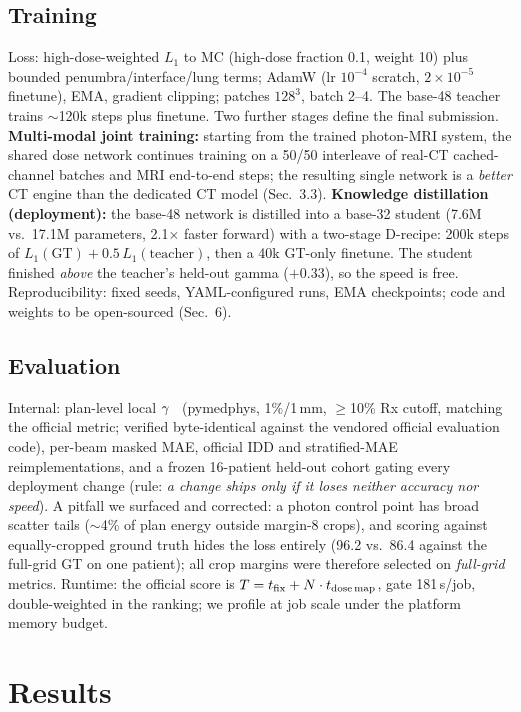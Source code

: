 \documentclass{llncs}
\begin{document}
\subsection{Training}
Loss: high-dose-weighted $L_1$ to MC (high-dose fraction 0.1, weight 10) plus bounded
penumbra/interface/lung terms; AdamW (lr $10^{-4}$ scratch, $2\times10^{-5}$ finetune), EMA,
gradient clipping; patches $128^3$, batch 2--4. The base-48 teacher trains $\sim$120k steps plus
finetune. Two further stages define the final submission. \textbf{Multi-modal joint training:}
starting from the trained photon-MRI system, the shared dose network continues training on a
50/50 interleave of real-CT cached-channel batches and MRI end-to-end steps; the resulting
single network is a \emph{better} CT engine than the dedicated CT model (Sec.~3.3).
\textbf{Knowledge distillation (deployment):} the base-48 network is distilled into a base-32
student (7.6M vs.\ 17.1M parameters, 2.1$\times$ faster forward) with a two-stage D-recipe:
200k steps of $L_1(\mathrm{GT})+0.5\,L_1(\mathrm{teacher})$, then a 40k GT-only finetune. The
student finished \emph{above} the teacher's held-out gamma ($+0.33$), so the speed is free.
Reproducibility: fixed seeds, YAML-configured runs, EMA checkpoints; code and weights to be
open-sourced (Sec.~6).

\subsection{Evaluation}
Internal: plan-level local $\gamma$~\cite{gamma} (pymedphys, 1\%/1\,mm, $\ge$10\% Rx cutoff,
matching the official metric; verified byte-identical against the vendored official evaluation
code), per-beam masked MAE, official IDD and stratified-MAE reimplementations, and a frozen
16-patient held-out cohort gating every deployment change (rule: \emph{a change ships only if it
loses neither accuracy nor speed}). A pitfall we surfaced and corrected: a photon control point
has broad scatter tails ($\sim$4\% of plan energy outside margin-8 crops), and scoring against
equally-cropped ground truth hides the loss entirely (96.2 vs.\ 86.4 against the full-grid GT on
one patient); all crop margins were therefore selected on \emph{full-grid} metrics. Runtime:
the official score is $T=t_{\rm fix}+N\cdot t_{\rm dose\,map}$, gate 181\,s/job, double-weighted
in the ranking; we profile at job scale under the platform memory budget.

\section{Results}
\end{document}
